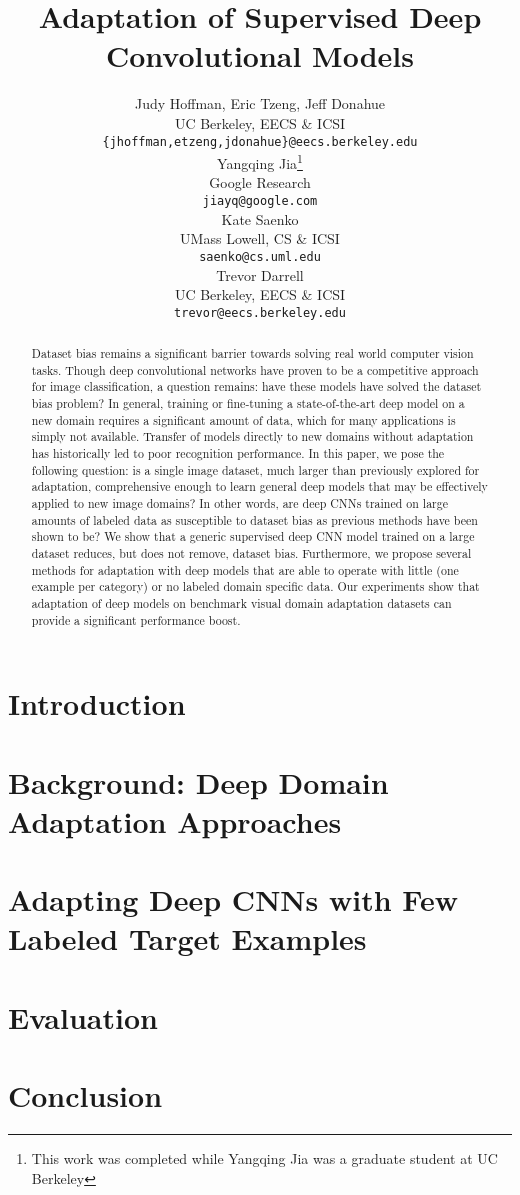 \documentclass{article} %
\title{Adaptation of Supervised Deep Convolutional Models}
\author{
Judy Hoffman, Eric Tzeng, Jeff Donahue \\
UC Berkeley, EECS \& ICSI\\
\footnotesize{\texttt{\{jhoffman,etzeng,jdonahue\}@eecs.berkeley.edu} }\\
\And
Yangqing Jia\thanks{This work was completed while Yangqing Jia was a graduate student at UC Berkeley} \\
Google Research \\
\texttt{jiayq@google.com} \\
\AND
Kate Saenko \\
UMass Lowell, CS \& ICSI \\
\footnotesize{\texttt{saenko@cs.uml.edu}} \\
\And
Trevor Darrell \\
UC Berkeley, EECS \& ICSI\\
\footnotesize{\texttt{trevor@eecs.berkeley.edu}} \\
}
\begin{document}
\maketitle

\begin{abstract}
Dataset bias remains a significant barrier towards solving real world computer vision tasks.
Though deep convolutional networks have proven to be a competitive approach for image classification, a question remains: have these models have solved the dataset bias problem?
In general, training or fine-tuning a state-of-the-art deep model on a new domain requires a significant amount of data, which for many applications is simply not available.
Transfer of models directly to new domains without adaptation has historically led to poor recognition performance.
In this paper, we pose the following question: is a single image dataset, much larger than previously explored for adaptation, comprehensive enough to learn general deep models that may be effectively applied to new image domains? In other words, are deep CNNs trained on large amounts of labeled data as susceptible to dataset bias as previous methods have been shown to be?
We show that a generic supervised deep CNN model trained on a large dataset reduces, but does not remove, dataset bias.
Furthermore, we propose several methods for adaptation with deep models that are able to operate with little (one example per category) or no labeled domain specific data.
Our experiments show that adaptation of deep models on benchmark visual domain adaptation datasets can provide a significant performance boost.

\end{abstract}

\section{Introduction}


\vspace{-.3cm}
\section{Background: Deep Domain Adaptation Approaches}
\vspace{-.2cm}


\vspace{-.3cm}
\section{Adapting Deep CNNs with Few Labeled Target Examples}
\label{sec:adapt-algs}
\vspace{-.2cm}


\section{Evaluation}


\section{Conclusion}



\small{


}
\end{document}
